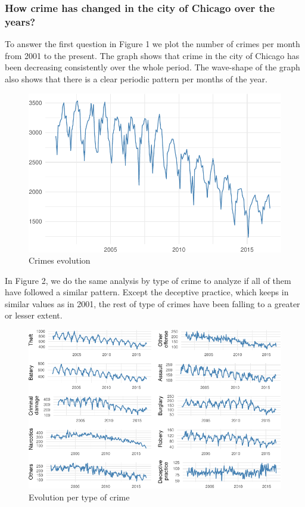 \documentclass[]{article}
\begin{document}
\subsubsection{How crime has changed in the city of Chicago over the
years?}\label{how-crime-has-changed-in-the-city-of-chicago-over-the-years}

To answer the first question in Figure 1 we plot the number of crimes
per month from 2001 to the present. The graph shows that crime in the
city of Chicago has been decreasing consistently over the whole period.
The wave-shape of the graph also shows that there is a clear periodic
pattern per months of the year.

\begin{figure}[htbp]
\centering
\includegraphics{Assessment_1v10_files/figure-latex/fig-1.pdf}
\caption{Crimes evolution}
\end{figure}

In Figure 2, we do the same analysis by type of crime to analyze if all
of them have followed a similar pattern. Except the deceptive practice,
which keeps in similar values as in 2001, the rest of type of crimes
have been falling to a greater or lesser extent.

\begin{figure}[H]

{\centering \includegraphics{Assessment_1v10_files/figure-latex/fig2-1} 

}

\caption{Evolution per type of crime}\label{fig:fig2}
\end{figure}
\end{document}
